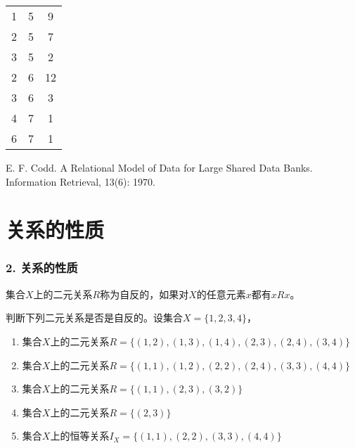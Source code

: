 \documentclass{beamer}
\begin{document}
\begin{CJK*}{UTF8}{gbsn}
\begin{frame}
  \begin{tabular}{ccc}
1& 5& 9\\
    2& 5&7 \\
    3& 5&2 \\
2&6 &12 \\
3&6 &3 \\
    4&7 &1 \\
    6&7 &1 \\
  \end{tabular}

    \begin{thebibliography}{99}
  E. F. Codd.
\newblock   A Relational Model of Data for Large Shared Data Banks.
\newblock Information Retrieval, 13(6): 1970.
  \end{thebibliography}

\end{frame}
\section{关系的性质}
\begin{frame}
  \frametitle{2. 关系的性质}
  \begin{Def}
    集合$X$上的二元关系$R$称为\alert{自反}的，如果对$X$的任意元素$x$都有$xRx$。
  \end{Def}
  \pause
    判断下列二元关系是否是自反的。设集合$X=\{1,2,3,4\}$，
  \begin{enumerate}
  \item 集合$X$上的二元关系$R=\{(1,2), (1,3), (1,4), (2,3),
    (2,4), (3,4)\}$
  \item 集合$X$上的二元关系$R=\{(1,1), (1,2), (2,2),
    (2,4), (3,3), (4,4)\}$
  \item 集合$X$上的二元关系$R = \{(1,1), (2,3), (3,2)\}$
  \item 集合$X$上的二元关系$R = \{(2,3)\}$
  \item 集合$X$上的恒等关系$I_X = \{(1,1), (2,2), (3,3),(4,4)\}$
  \end{enumerate}

\end{frame}


\end{CJK*}
\end{document}
